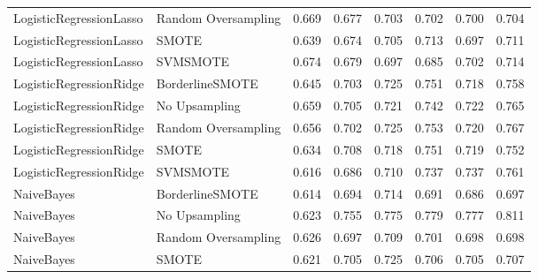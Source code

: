 \begin{tabular}{llllllll}
     LogisticRegressionLasso & Random Oversampling & 0.669 &                     0.677 &                 0.703 &                  0.702 &                                   0.700 &    0.704 \\
     LogisticRegressionLasso &               SMOTE & 0.639 &                     0.674 &                 0.705 &                  0.713 &                                   0.697 &    0.711 \\
     LogisticRegressionLasso &            SVMSMOTE & 0.674 &                     0.679 &                 0.697 &                  0.685 &                                   0.702 &    0.714 \\
     LogisticRegressionRidge &     BorderlineSMOTE & 0.645 &                     0.703 &                 0.725 &                  0.751 &                                   0.718 &    0.758 \\
     LogisticRegressionRidge &       No Upsampling & 0.659 &                     0.705 &                 0.721 &                  0.742 &                                   0.722 &    0.765 \\
     LogisticRegressionRidge & Random Oversampling & 0.656 &                     0.702 &                 0.725 &                  0.753 &                                   0.720 &    0.767 \\
     LogisticRegressionRidge &               SMOTE & 0.634 &                     0.708 &                 0.718 &                  0.751 &                                   0.719 &    0.752 \\
     LogisticRegressionRidge &            SVMSMOTE & 0.616 &                     0.686 &                 0.710 &                  0.737 &                                   0.737 &    0.761 \\
                  NaiveBayes &     BorderlineSMOTE & 0.614 &                     0.694 &                 0.714 &                  0.691 &                                   0.686 &    0.697 \\
                  NaiveBayes &       No Upsampling & 0.623 &                     0.755 &                 0.775 &                  0.779 &                                   0.777 &    0.811 \\
                  NaiveBayes & Random Oversampling & 0.626 &                     0.697 &                 0.709 &                  0.701 &                                   0.698 &    0.698 \\
                  NaiveBayes &               SMOTE & 0.621 &                     0.705 &                 0.725 &                  0.706 &                                   0.705 &    0.707 \\

\end{tabular}
